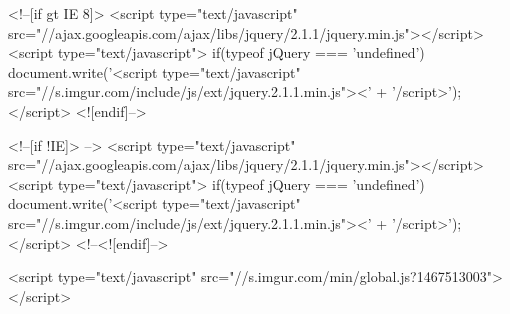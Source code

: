 <!--[if gt IE 8]>
<script type="text/javascript" src="//ajax.googleapis.com/ajax/libs/jquery/2.1.1/jquery.min.js"></script>
<script type="text/javascript">
if(typeof jQuery === 'undefined') {
    document.write('<script type="text/javascript" src="//s.imgur.com/include/js/ext/jquery.2.1.1.min.js"><' + '/script>');
}
</script>
<![endif]-->

<!--[if !IE]> -->
<script type="text/javascript" src="//ajax.googleapis.com/ajax/libs/jquery/2.1.1/jquery.min.js"></script>
<script type="text/javascript">
if(typeof jQuery === 'undefined') {
    document.write('<script type="text/javascript" src="//s.imgur.com/include/js/ext/jquery.2.1.1.min.js"><' + '/script>');
}
</script>
<!--<![endif]-->



        <script type="text/javascript" src="//s.imgur.com/min/global.js?1467513003"></script>

